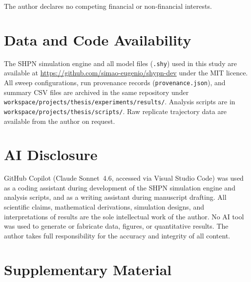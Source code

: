 \documentclass[11pt,a4paper]{article}
\begin{document}
The author declares no competing financial or non-financial interests.

\section*{Data and Code Availability}

The SHPN simulation engine and all model files (\texttt{.shy}) used in
this study are available at
\url{https://github.com/simao-eugenio/shypn-dev} under the MIT licence.
All sweep configurations, run provenance records (\texttt{provenance.json}),
and summary CSV files are archived in the same repository under
\texttt{workspace/projects/thesis/experiments/results/}.
Analysis scripts are in \texttt{workspace/projects/thesis/scripts/}.
Raw replicate trajectory data are available from the author on request.

\section*{AI Disclosure}

GitHub Copilot (Claude Sonnet~4.6, accessed via Visual Studio Code) was
used as a coding assistant during development of the SHPN simulation
engine and analysis scripts, and as a writing assistant during
manuscript drafting.
All scientific claims, mathematical derivations, simulation designs, and
interpretations of results are the sole intellectual work of the author.
No AI tool was used to generate or fabricate data, figures, or
quantitative results.
The author takes full responsibility for the accuracy and integrity of
all content.

\section*{Supplementary Material}
\end{document}

